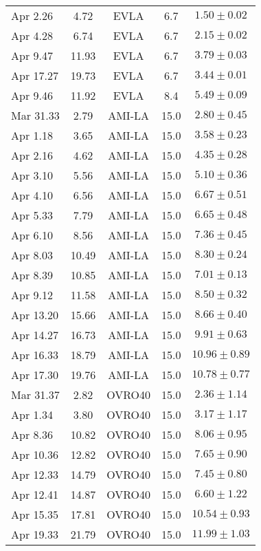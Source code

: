 \begin{center}
\begin{longtable}{lcccc}
Apr 2.26    &  4.72  & EVLA & 6.7 & $1.50\pm 0.02$  \\
Apr 4.28    &  6.74  & EVLA & 6.7 & $2.15\pm 0.02$  \\
Apr 9.47    &  11.93 & EVLA & 6.7 & $3.79\pm 0.03$  \\
Apr 17.27   &  19.73 & EVLA & 6.7 & $3.44\pm 0.01$  \\\hline
%
Apr 9.46    &  11.92  & EVLA & 8.4 & $5.49\pm 0.09$  \\\hline
%
Mar 31.33   &  2.79  & AMI-LA & 15.0 & $2.80\pm 0.45$ \\
Apr 1.18    &  3.65  & AMI-LA & 15.0 & $3.58\pm 0.23$ \\
Apr 2.16    &  4.62  & AMI-LA & 15.0 & $4.35\pm 0.28$ \\
Apr 3.10    &  5.56  & AMI-LA & 15.0 & $5.10\pm 0.36$ \\
Apr 4.10    &  6.56  & AMI-LA & 15.0 & $6.67\pm 0.51$ \\
Apr 5.33    &  7.79  & AMI-LA & 15.0 & $6.65\pm 0.48$ \\
Apr 6.10    &  8.56  & AMI-LA & 15.0 & $7.36\pm 0.45$ \\
Apr 8.03    &  10.49 & AMI-LA & 15.0 & $8.30\pm 0.24$ \\
Apr 8.39    &  10.85 & AMI-LA & 15.0 & $7.01\pm 0.13$ \\
Apr 9.12    &  11.58 & AMI-LA & 15.0 & $8.50\pm 0.32$ \\
Apr 13.20   &  15.66 & AMI-LA & 15.0 & $8.66\pm 0.40$ \\
Apr 14.27   &  16.73 & AMI-LA & 15.0 & $9.91\pm 0.63$ \\
Apr 16.33   &  18.79 & AMI-LA & 15.0 & $10.96\pm 0.89$ \\
Apr 17.30   &  19.76 & AMI-LA & 15.0 & $10.78\pm 0.77$ \\\hline
%
Mar 31.37   & 2.82  & OVRO40 & 15.0 & $2.36\pm 1.14$ \\
Apr 1.34    & 3.80  & OVRO40 & 15.0 & $3.17\pm 1.17$ \\
Apr 8.36    & 10.82 & OVRO40 & 15.0 & $8.06\pm 0.95$ \\
Apr 10.36   & 12.82 & OVRO40 & 15.0 & $7.65\pm 0.90$ \\
Apr 12.33   & 14.79 & OVRO40 & 15.0 & $7.45\pm 0.80$ \\
Apr 12.41   & 14.87 & OVRO40 & 15.0 & $6.60\pm 1.22$ \\
Apr 15.35   & 17.81 & OVRO40 & 15.0 & $10.54\pm 0.93$ \\
Apr 19.33   & 21.79 & OVRO40 & 15.0 & $11.99\pm 1.03$ \\

\end{longtable}
\end{center}
